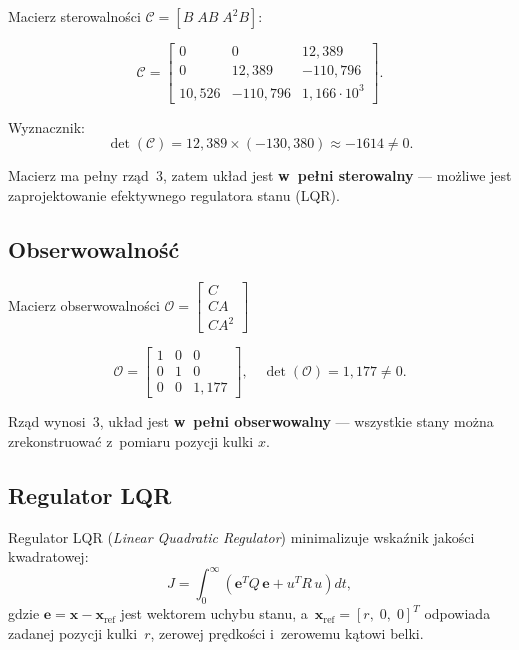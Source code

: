 Macierz sterowalności $\mathcal{C} = [B\;AB\;A^2B]$:

\begin{equation}
  \mathcal{C} = \begin{bmatrix}
    0       &  0       & 12{,}389 \\
    0       & 12{,}389 & -110{,}796 \\
    10{,}526 & -110{,}796 & 1{,}166\cdot10^3
  \end{bmatrix}.
\end{equation}

Wyznacznik:
\begin{equation}
  \det(\mathcal{C}) = 12{,}389 \times (-130{,}380) \approx -1614 \neq 0.
\end{equation}

Macierz ma pełny rząd~3, zatem układ jest \textbf{w~pełni sterowalny} —
możliwe jest zaprojektowanie efektywnego regulatora stanu (LQR).

\subsection{Obserwowalność}

Macierz obserwowalności $\mathcal{O} = \begin{bmatrix}
  C\\CA\\CA^2
\end{bmatrix}$

\begin{equation}
  \mathcal{O} = \begin{bmatrix}
    1 & 0 & 0 \\
    0 & 1 & 0 \\
    0 & 0 & 1{,}177
  \end{bmatrix}, \quad
  \det(\mathcal{O}) = 1{,}177 \neq 0.
\end{equation}

Rząd wynosi~3, układ jest \textbf{w~pełni obserwowalny} — wszystkie stany
można zrekonstruować z~pomiaru pozycji kulki $x$.

\subsection{Regulator LQR}

Regulator LQR (\textit{Linear Quadratic Regulator}) minimalizuje wskaźnik
jakości kwadratowej:
\begin{equation}
  J = \int_0^\infty \left( \mathbf{e}^T Q\,\mathbf{e} + u^T R\,u \right) dt,
\end{equation}
gdzie $\mathbf{e} = \mathbf{x} - \mathbf{x}_\mathrm{ref}$ jest wektorem uchybu stanu,
a~$\mathbf{x}_\mathrm{ref} = [r,\;0,\;0]^T$ odpowiada zadanej pozycji kulki~$r$,
zerowej prędkości i~zerowemu kątowi belki.

